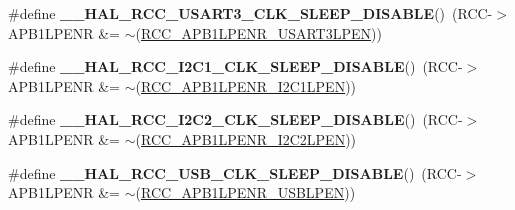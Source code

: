 \begin{DoxyCompactItemize}
\item 
\hypertarget{group___r_c_c___peripheral___clock___sleep___enable___disable_gaa395d9d235caf02cac62e5dfb1d0c957}{\#define {\bfseries \-\_\-\-\_\-\-H\-A\-L\-\_\-\-R\-C\-C\-\_\-\-U\-S\-A\-R\-T3\-\_\-\-C\-L\-K\-\_\-\-S\-L\-E\-E\-P\-\_\-\-D\-I\-S\-A\-B\-L\-E}()~(R\-C\-C-\/$>$A\-P\-B1\-L\-P\-E\-N\-R \&= $\sim$(\hyperlink{group___peripheral___registers___bits___definition_gae11baa29f4e6d122dabdd54c6b4be052}{R\-C\-C\-\_\-\-A\-P\-B1\-L\-P\-E\-N\-R\-\_\-\-U\-S\-A\-R\-T3\-L\-P\-E\-N}))}\label{group___r_c_c___peripheral___clock___sleep___enable___disable_gaa395d9d235caf02cac62e5dfb1d0c957}

\item 
\hypertarget{group___r_c_c___peripheral___clock___sleep___enable___disable_gac7dc1c5239cd70bee94eefa3d91cdd7a}{\#define {\bfseries \-\_\-\-\_\-\-H\-A\-L\-\_\-\-R\-C\-C\-\_\-\-I2\-C1\-\_\-\-C\-L\-K\-\_\-\-S\-L\-E\-E\-P\-\_\-\-D\-I\-S\-A\-B\-L\-E}()~(R\-C\-C-\/$>$A\-P\-B1\-L\-P\-E\-N\-R \&= $\sim$(\hyperlink{group___peripheral___registers___bits___definition_ga33286469d0a9b9fedbc2b60aa6cd7da7}{R\-C\-C\-\_\-\-A\-P\-B1\-L\-P\-E\-N\-R\-\_\-\-I2\-C1\-L\-P\-E\-N}))}\label{group___r_c_c___peripheral___clock___sleep___enable___disable_gac7dc1c5239cd70bee94eefa3d91cdd7a}

\item 
\hypertarget{group___r_c_c___peripheral___clock___sleep___enable___disable_ga46fe2d4331320cfe49b751b5488fc0cd}{\#define {\bfseries \-\_\-\-\_\-\-H\-A\-L\-\_\-\-R\-C\-C\-\_\-\-I2\-C2\-\_\-\-C\-L\-K\-\_\-\-S\-L\-E\-E\-P\-\_\-\-D\-I\-S\-A\-B\-L\-E}()~(R\-C\-C-\/$>$A\-P\-B1\-L\-P\-E\-N\-R \&= $\sim$(\hyperlink{group___peripheral___registers___bits___definition_gaf6a53d37df11a56412ae06f73626f637}{R\-C\-C\-\_\-\-A\-P\-B1\-L\-P\-E\-N\-R\-\_\-\-I2\-C2\-L\-P\-E\-N}))}\label{group___r_c_c___peripheral___clock___sleep___enable___disable_ga46fe2d4331320cfe49b751b5488fc0cd}

\item 
\hypertarget{group___r_c_c___peripheral___clock___sleep___enable___disable_ga163a738dca988a270e8a1901cbeabd1f}{\#define {\bfseries \-\_\-\-\_\-\-H\-A\-L\-\_\-\-R\-C\-C\-\_\-\-U\-S\-B\-\_\-\-C\-L\-K\-\_\-\-S\-L\-E\-E\-P\-\_\-\-D\-I\-S\-A\-B\-L\-E}()~(R\-C\-C-\/$>$A\-P\-B1\-L\-P\-E\-N\-R \&= $\sim$(\hyperlink{group___peripheral___registers___bits___definition_ga9c068ba6f9554c5b98ddc7c87b658e1e}{R\-C\-C\-\_\-\-A\-P\-B1\-L\-P\-E\-N\-R\-\_\-\-U\-S\-B\-L\-P\-E\-N}))}\label{group___r_c_c___peripheral___clock___sleep___enable___disable_ga163a738dca988a270e8a1901cbeabd1f}


\end{DoxyCompactItemize}
